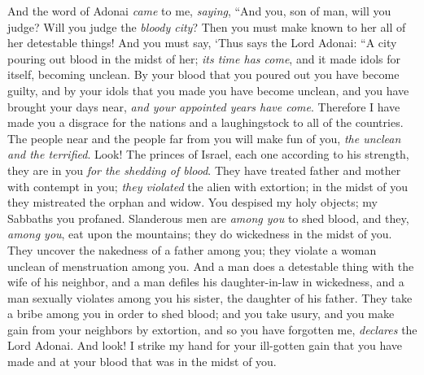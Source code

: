\begin{biblechapter} %
 And the word of Adonai \textit{came} to me, \textit{saying},
\verse “And you, son of man, will you judge? Will you judge the \textit{bloody city}? Then you must make known to her all of her detestable things!
\verse And you must say, ‘Thus says the Lord Adonai: “A city pouring out blood in the midst of her; \textit{its time has come}, and it made idols for itself, becoming unclean.
\verse By your blood that you poured out you have become guilty, and by your idols that you made you have become unclean, and you have brought your days near, \textit{and your appointed years have come}. Therefore I have made you a disgrace for the nations and a laughingstock to all of the countries.
\verse The people near and the people far from you will make fun of you, \textit{the unclean and the terrified}.
\verse Look! The princes of Israel, each one according to his strength, they are in you \textit{for the shedding of blood}.
\verse They have treated father and mother with contempt in you; \textit{they violated} the alien with extortion; in the midst of you they mistreated the orphan and widow.
\verse You despised my holy objects; my Sabbaths you profaned.
\verse Slanderous men are \textit{among you} to shed blood, and they, \textit{among you}, eat upon the mountains; they do wickedness in the midst of you.
\verse They uncover the nakedness of a father among you; they violate a woman unclean of menstruation among you.
\verse And a man does a detestable thing with the wife of his neighbor, and a man defiles his daughter-in-law in wickedness, and a man sexually violates among you his sister, the daughter of his father.
\verse They take a bribe among you in order to shed blood; and you take usury, and you make gain from your neighbors by extortion, and so you have forgotten me, \textit{declares} the Lord Adonai.
\verse And look! I strike my hand for your ill-gotten gain that you have made and at your blood that was in the midst of you.

\end{biblechapter}
